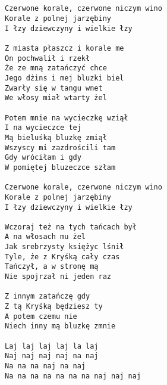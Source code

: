 \documentclass[12pt]{article}
\begin{document}
\subsection*{}
\begin{verbatim}
Czerwone korale, czerwone niczym wino
Korale z polnej jarzębiny
I łzy dziewczyny i wielkie łzy

Z miasta płaszcz i korale me
On pochwalił i rzekł
Że ze mną zatańczyć chce
Jego dżins i mej bluzki biel
Zwarły się w tangu wnet
We włosy miał wtarty żel

Potem mnie na wycieczkę wziął
I na wycieczce tej
Mą bieluśką bluzkę zmiął
Wszyscy mi zazdrościli tam
Gdy wróciłam i gdy
W pomiętej bluzeczce szłam

Czerwone korale, czerwone niczym wino
Korale z polnej jarzębiny
I łzy dziewczyny i wielkie łzy

Wczoraj też na tych tańcach był
A na włosach mu żel
Jak srebrzysty księżyc lśnił
Tyle, że z Kryśką cały czas
Tańczył, a w stronę mą
Nie spojrzał ni jeden raz

Z innym zatańczę gdy
Z tą Kryśką będziesz ty
A potem czemu nie
Niech inny mą bluzkę zmnie

Laj laj laj laj la laj
Naj naj naj naj na naj
Na na na naj na naj
Na na na na na na na naj naj naj
\end{verbatim}
\clearpage
\end{document}
